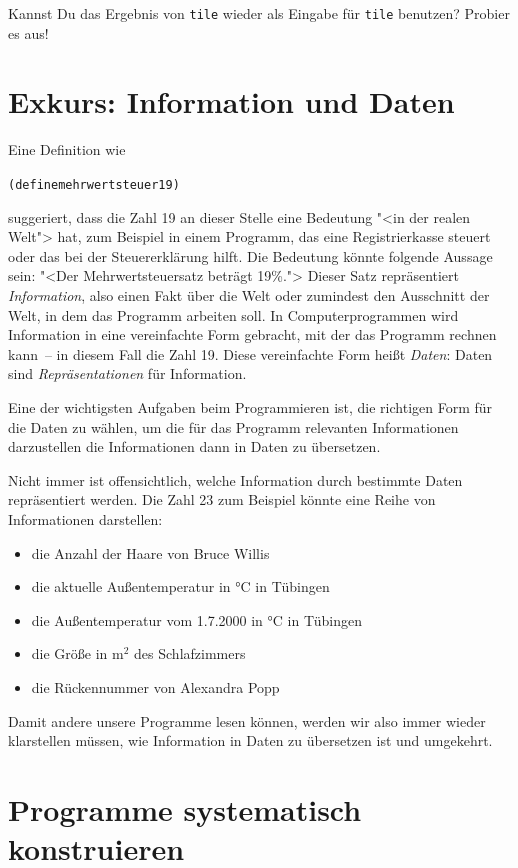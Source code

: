 \begin{aufgabe}
  Kannst Du das Ergebnis von \texttt{tile} wieder als Eingabe für
  \texttt{tile} benutzen?  Probier es aus!
\end{aufgabe}

\section{Exkurs: Information und Daten}

Eine Definition wie
%
\begin{alltt}
(define mehrwertsteuer 19)
\end{alltt}
%
suggeriert, dass die Zahl 19 an dieser Stelle eine Bedeutung "<in der
realen Welt"> hat, zum Beispiel in einem Programm, das eine Registrierkasse
steuert oder das bei der Steuererklärung hilft.  Die Bedeutung könnte
folgende Aussage sein: "<Der Mehrwertsteuersatz beträgt 19\%.">
Dieser Satz repräsentiert \textit{Information},
also einen Fakt über die Welt oder zumindest den Ausschnitt der Welt, in
dem das Programm arbeiten soll.  In Computerprogrammen wird
Information in eine vereinfachte Form gebracht, mit der das Programm
rechnen kann~-- in diesem Fall die Zahl 19.  Diese vereinfachte Form
heißt \textit{Daten}: Daten sind
\textit{Repräsentationen} für Information.

Eine der wichtigsten Aufgaben beim Programmieren ist, die richtigen
Form für die Daten zu wählen, um die für das Programm relevanten
Informationen darzustellen die Informationen dann in Daten zu
übersetzen.

Nicht immer ist offensichtlich, welche Information durch bestimmte
Daten repräsentiert werden.  Die Zahl 23 zum Beispiel könnte eine Reihe
von Informationen darstellen:
%
\begin{itemize}
\item die Anzahl der Haare von Bruce Willis
\item die aktuelle Außentemperatur in °C in Tübingen
\item die Außentemperatur vom 1.7.2000 in °C in Tübingen
\item die Größe in m$^2$ des Schlafzimmers
\item die Rückennummer von Alexandra Popp
\end{itemize}
%
Damit andere unsere Programme lesen können, werden wir also immer
wieder klarstellen müssen, wie Information in Daten zu übersetzen ist
und umgekehrt.

\section{Programme systematisch konstruieren}


